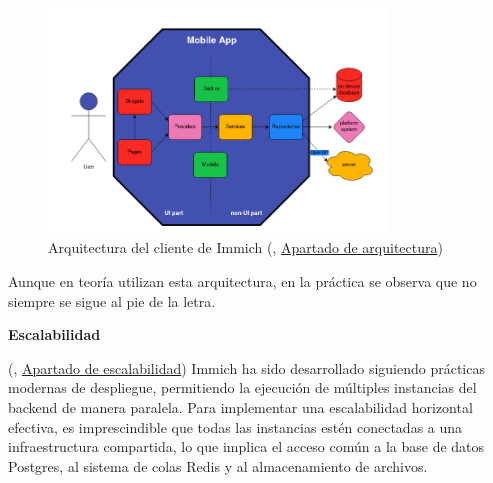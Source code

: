 \begin{figure}[H]
  \centering
  \includegraphics[width=0.8\textwidth]{assets/immich-architecture-client.png}
  \caption{Arquitectura del cliente de Immich (\cite{immich-documentation}, \href{https://immich.app/docs/developer/architecture/}{Apartado de arquitectura})}
  \label{fig:immich-architecture-client}
\end{figure}

Aunque en teoría utilizan esta arquitectura, en la práctica se observa que no siempre se sigue al pie de la letra.

\textbf{Escalabilidad}

(\cite{immich-documentation}, \href{https://immich.app/docs/guides/scaling-immich/}{Apartado de escalabilidad}) Immich ha sido desarrollado siguiendo prácticas modernas de despliegue, permitiendo la ejecución de múltiples instancias del backend de manera paralela. Para implementar una escalabilidad horizontal efectiva, es imprescindible que todas las instancias estén conectadas a una infraestructura compartida, lo que implica el acceso común a la base de datos Postgres, al sistema de colas Redis y al almacenamiento de archivos.

